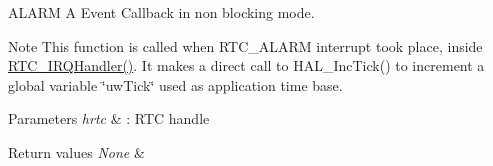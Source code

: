A\+L\+A\+RM A Event Callback in non blocking mode. 

\begin{DoxyNote}{Note}
This function is called when R\+T\+C\+\_\+\+A\+L\+A\+RM interrupt took place, inside \hyperlink{group___h_a_l___time_base___r_t_c___alarm___template_gab86b9dd0d7b4eacfe38086e1fa4c2312}{R\+T\+C\+\_\+\+I\+R\+Q\+Handler()}. It makes a direct call to H\+A\+L\+\_\+\+Inc\+Tick() to increment a global variable \char`\"{}uw\+Tick\char`\"{} used as application time base. 
\end{DoxyNote}

\begin{DoxyParams}{Parameters}
{\em hrtc} & \+: R\+TC handle \\
\hline
\end{DoxyParams}

\begin{DoxyRetVals}{Return values}
{\em None} & \\
\hline
\end{DoxyRetVals}
